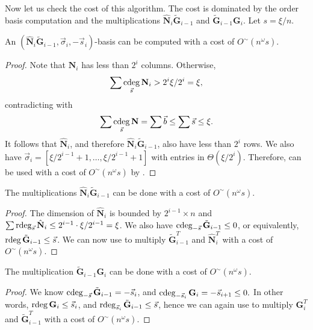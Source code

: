 Now let us check the cost of this algorithm. The cost is dominated
by the order basis computation and the multiplications $\hat{\mathbf{N}}_{i}\tilde{\mathbf{G}}_{i-1}$
and $\tilde{\mathbf{G}}_{i-1}\mathbf{G}_{i}$. Let $s=\xi/n$.
\begin{lem}
An $\left(\hat{\mathbf{N}}_{i}\tilde{\mathbf{G}}_{i-1},\vec{\sigma}_{i},-\vec{s}_{i}\right)$-basis
can be computed with a cost of $O^{\sim}\left(n^{\omega}s\right)$.\end{lem}
\begin{proof}
Note that $\mathbf{N}_{i}$ has less than $2^{i}$ columns. Otherwise,
\[
\sum\cdeg_{\vec{s}}\mathbf{N}_{i}>2^{i}\xi/2^{i}=\xi,
\]
contradicting with 
\[
\sum\cdeg_{\vec{s}}\mathbf{N}=\sum\vec{b}\le\sum\vec{s}\le\xi.
\]
It follows that $\hat{\mathbf{N}}_{i}$, and therefore $\hat{\mathbf{N}}_{i}\tilde{\mathbf{G}}_{i-1}$,
also have less than $2^{i}$ rows. We also have $\vec{\sigma}_{i}=\left[\xi/2^{i-1}+1,\dots,\xi/2^{i-1}+1\right]$
with entries in $\Theta\left(\xi/2^{i}\right)$. Therefore, 
can be used with a cost of $O^{\sim}\left(n^{\omega}s\right)$ by
.\end{proof}
\begin{lem}
The multiplications $\hat{\mathbf{N}}_{i}\tilde{\mathbf{G}}_{i-1}$
can be done with a cost of $O^{\sim}\left(n^{\omega}s\right)$.\end{lem}
\begin{proof}
The dimension of $\hat{\mathbf{N}}_{i}$ is bounded by $2^{i-1}\times n$
and $\sum\rdeg_{\vec{s}}\hat{\mathbf{N}}_{i}\le2^{i-1}\cdot\xi/2^{i-1}=\xi$.
We also have $\cdeg_{-\vec{s}}\tilde{\mathbf{G}}_{i-1}\le0$, or equivalently,
$\rdeg\tilde{\mathbf{G}}_{i-1}\le\vec{s}$. We can now use 
to multiply $\tilde{\mathbf{G}}_{i-1}^{T}$ and $\hat{\mathbf{N}}_{i}^{T}$
with a cost of $O^{\sim}\left(n^{\omega}s\right)$.\end{proof}
\begin{lem}
The multiplication $\tilde{\mathbf{G}}_{i-1}\mathbf{G}_{i}$ can be
done with a cost of $O^{\sim}\left(n^{\omega}s\right)$.\end{lem}
\begin{proof}
We know $\cdeg_{-\vec{s}}\tilde{\mathbf{G}}_{i-1}=-\vec{s}_{i}$,
and $\cdeg_{-\vec{s}_{i}}\mathbf{G}_{i}=-\vec{s}_{i+1}\le0.$ In other
words, $\rdeg\mathbf{G}_{i}\le\vec{s}_{i}$, and $\rdeg_{\vec{s}_{i}}\tilde{\mathbf{G}}_{i-1}\le\vec{s}$,
hence we can again use 
to multiply $\mathbf{G}_{i}^{T}$ and $\tilde{\mathbf{G}}_{i-1}^{T}$
with a cost of $O^{\sim}\left(n^{\omega}s\right)$.\end{proof}

